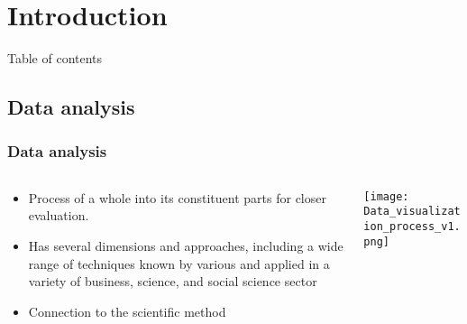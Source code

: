\section{Introduction}
\SectionPage
\begin{frame}{Table of contents}
    \tableofcontents[currentsection]
\end{frame}

\subsection{Data analysis}
\begin{frame}
    \frametitle{Data analysis}
    \vspace*{\fill}

    \begin{columns}[onlytextwidth, c]
        \begin{column}{0.5\textwidth}
            \begin{itemize}[<+-|alert@+>]
                \item Process of  a whole into its constituent parts for closer evaluation.
                \item Has several dimensions and approaches, including a wide
                range of techniques known by various  and applied in a variety of
                business, science, and social science sector
                \item Connection to the scientific method
            \end{itemize}
        \end{column}
        \begin{column}{0.5\textwidth}
            \texttt{[image: Data\_visualization\_process\_v1.png]}
        \end{column}
    \end{columns}
    \vspace*{\fill}
\end{frame}

